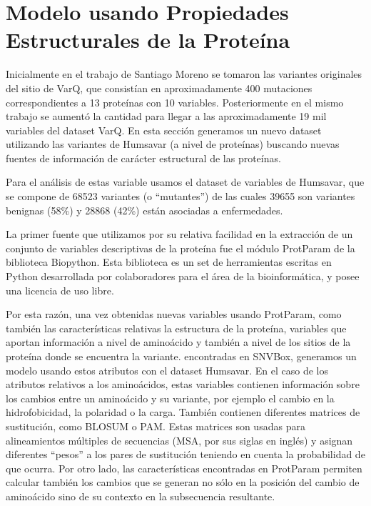 \section{Modelo usando Propiedades Estructurales de la Proteína}

Inicialmente en el trabajo de Santiago Moreno se tomaron las variantes originales del sitio de VarQ, que consistían en aproximadamente 400 mutaciones correspondientes a 13 proteínas con 10 variables. Posteriormente en el mismo trabajo se aumentó la cantidad para llegar a las aproximadamente 19 mil variables del dataset VarQ. En esta sección generamos un nuevo dataset utilizando las variantes de Humsavar (a nivel de proteínas) buscando nuevas fuentes de información de carácter estructural de las proteínas.

Para el análisis de estas variable usamos el dataset de variables de Humsavar, que se compone de 68523 variantes (o ``mutantes'') de las cuales 39655 son variantes benignas (58\%) y 28868 (42\%) están asociadas a enfermedades. 

La primer fuente que utilizamos por su relativa facilidad en la extracción de un conjunto de variables descriptivas de la proteína fue el módulo ProtParam de la biblioteca Biopython. Esta biblioteca es un set de herramientas escritas en Python desarrollada por colaboradores para el área de la bioinformática, y posee una licencia de uso libre.



Por esta razón, una vez obtenidas nuevas variables usando ProtParam, como también las características relativas la estructura de la proteína, variables que aportan información a nivel de aminoácido y también a nivel de los sitios de la proteína donde se encuentra la variante. encontradas en SNVBox, generamos un modelo usando estos atributos con el dataset Humsavar. En el caso de los atributos relativos a los aminoácidos, estas variables contienen información sobre los cambios entre un aminoácido y su variante, por ejemplo el cambio en la hidrofobicidad, la polaridad o la carga. También contienen diferentes matrices de sustitución, como BLOSUM o PAM. Estas matrices son usadas para alineamientos múltiples de secuencias (MSA, por sus siglas en inglés) y asignan diferentes ``pesos'' a los pares de sustitución teniendo en cuenta la probabilidad de que ocurra. Por otro lado, las características encontradas en ProtParam permiten calcular también los cambios que se generan no sólo en la posición del cambio de aminoácido sino de su contexto en la subsecuencia resultante. 

